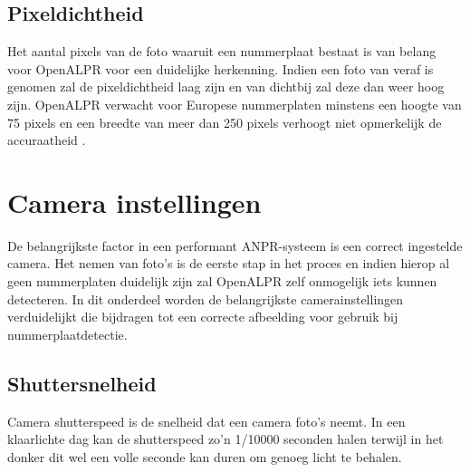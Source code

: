 \subsection{Pixeldichtheid}
Het aantal pixels van de foto waaruit een nummerplaat bestaat is van belang voor OpenALPR voor een duidelijke herkenning. Indien een foto van veraf is genomen zal de pixeldichtheid laag zijn en van dichtbij zal deze dan weer hoog zijn. OpenALPR verwacht voor Europese nummerplaten minstens een hoogte van 75 pixels en een breedte van meer dan 250 pixels verhoogt niet opmerkelijk de accuraatheid  \autocite{openalprcameraplacement}.

\section{Camera instellingen}
De belangrijkste factor in een performant ANPR-systeem is een correct ingestelde camera. Het nemen van foto's is de eerste stap in het proces en indien hierop al geen nummerplaten duidelijk zijn zal OpenALPR zelf onmogelijk iets kunnen detecteren. In dit onderdeel worden de belangrijkste camerainstellingen verduidelijkt die bijdragen tot een correcte afbeelding voor gebruik bij nummerplaatdetectie.

\subsection{Shuttersnelheid}

Camera shutterspeed is de snelheid dat een camera foto's neemt. In een klaarlichte dag kan de shutterspeed zo'n 1/10000 seconden halen terwijl in het donker dit wel een volle seconde kan duren om genoeg licht te behalen. \autocite{openalprcameraplacement}

